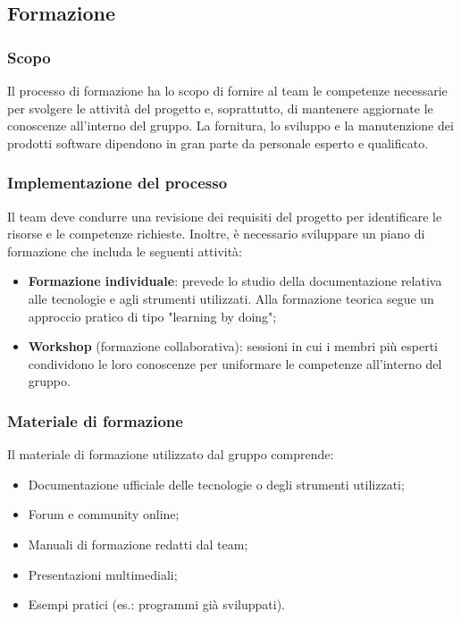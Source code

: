 \subsection{Formazione}
\subsubsection{Scopo}
\par Il processo di formazione ha lo scopo di fornire al team le competenze necessarie per svolgere le attività del progetto e, soprattutto, di mantenere aggiornate le conoscenze all'interno del gruppo. La fornitura, lo sviluppo e la manutenzione dei prodotti software dipendono in gran parte da personale esperto e qualificato.

\subsubsection{Implementazione del processo}
\par Il team deve condurre una revisione dei requisiti del progetto per identificare le risorse e le competenze richieste. Inoltre, è necessario sviluppare un piano di formazione che includa le seguenti attività:
\begin{itemize}
  \item \textbf{Formazione individuale}: prevede lo studio della documentazione relativa alle tecnologie e agli strumenti utilizzati. Alla formazione teorica segue un approccio pratico di tipo "learning by doing";
  \item \textbf{Workshop} (formazione collaborativa): sessioni in cui i membri più esperti condividono le loro conoscenze per uniformare le competenze all'interno del gruppo.
\end{itemize}

\subsubsection{Materiale di formazione}
\par Il materiale di formazione utilizzato dal gruppo comprende:
\begin{itemize}
  \item Documentazione ufficiale delle tecnologie o degli strumenti utilizzati;
  \item Forum e community online;
  \item Manuali di formazione redatti dal team;
  \item Presentazioni multimediali;
  \item Esempi pratici (es.: programmi già sviluppati).
\end{itemize}

